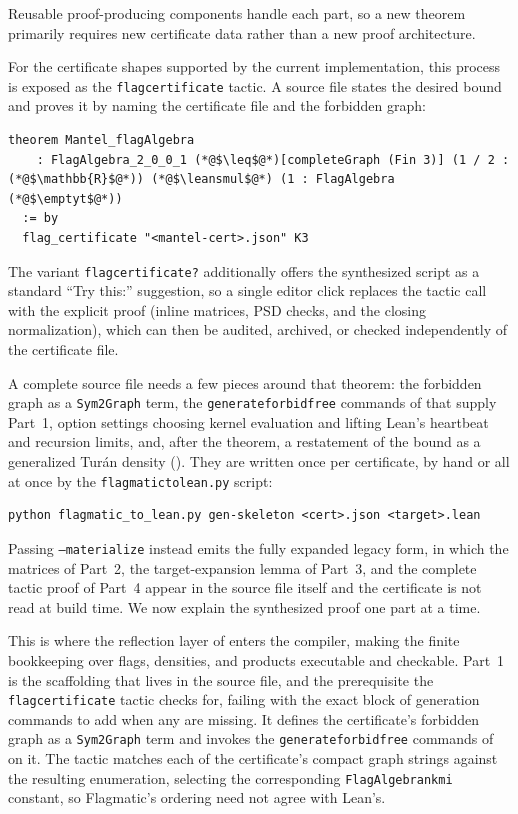 \documentclass[acmsmall,screen=true,acmthm=false]{acmart}
\newcommand{\boldparagraph}[1]{\noindentparagraph{\textnormal{\textbf{#1}}}}
\DeclareRobustCommand{\lean}[1]{{\def\_{\textunderscore\allowbreak}\texttt{#1}}}
\newcommand{\emptyt}{\emptyset_{\mathrm{t}}}
\newcommand{\leansmul}{\mathbin{\vcenter{\hbox{$\scriptstyle\bullet$}}}}
\begin{document}
Reusable proof-producing components handle each part, so a new theorem
primarily requires new certificate data rather than a new proof architecture.

For the certificate shapes supported by the current implementation, this
process is exposed as the \lean{flag\_certificate} tactic.  A source file
states the desired bound and proves it by naming the certificate file and the
forbidden graph:
\begin{lstlisting}[emph={flag_certificate},emphstyle=\color{blue!70!black}\bfseries]
theorem Mantel_flagAlgebra
    : FlagAlgebra_2_0_0_1 (*@$\leq$@*)[completeGraph (Fin 3)] (1 / 2 : (*@$\mathbb{R}$@*)) (*@$\leansmul$@*) (1 : FlagAlgebra (*@$\emptyt$@*))
  := by
  flag_certificate "<mantel-cert>.json" K3
\end{lstlisting}
The variant \lean{flag\_certificate?} additionally offers
the synthesized script as a standard ``Try this:'' suggestion, so a single
editor click replaces the tactic call with the explicit proof (inline
matrices, PSD checks, and the closing normalization), which can then be
audited, archived, or checked independently of the certificate file.

A complete source file needs a few pieces around that theorem: the forbidden
graph as a \lean{Sym2Graph} term, the \lean{generate\_forbid\_free\_*} commands
of  that supply Part~1, option settings
choosing kernel evaluation and lifting Lean's heartbeat and recursion limits,
and, after the theorem, a restatement of the bound as a generalized Tur\'an
density ().  They are written once per certificate, by hand
or all at once by the \lean{flagmatic\_to\_lean.py} script:
\begin{lstlisting}[language={}]
python flagmatic_to_lean.py gen-skeleton <cert>.json <target>.lean
\end{lstlisting}
Passing \lean{--materialize} instead emits the fully
expanded legacy form, in which the matrices of Part~2, the target-expansion
lemma of Part~3, and the complete tactic proof of Part~4 appear in the
source file itself and the certificate is not read at build time.  We now
explain the synthesized proof one part at a time.

\boldparagraph{Generating the flags and their identities (Part~1).}
This is where the reflection layer of  enters the
compiler, making the finite bookkeeping over flags, densities, and products
executable and checkable.  Part~1 is the scaffolding that lives in the source
file, and the prerequisite the \lean{flag\_certificate} tactic checks for,
failing with the exact block of generation commands to add when any are
missing.  It
defines the certificate's forbidden graph as a \lean{Sym2Graph} term and
invokes the \lean{generate\_forbid\_free\_*} commands of
 on it.  The tactic matches each of the certificate's
compact graph strings against the resulting enumeration, selecting the
corresponding
\lean{FlagAlgebra\_n\_k\_m\_i} constant, so Flagmatic's ordering need not
agree with Lean's.
\end{document}
